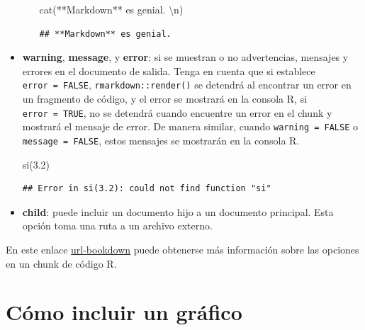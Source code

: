 \documentclass[12pt,a4paper,oneside,]{book}
\newenvironment{Shaded}{\begin{snugshade}}{\end{snugshade}}
\newcommand{\FloatTok}[1]{\textcolor[rgb]{0.00,0.00,0.81}{#1}}
\newcommand{\FunctionTok}[1]{\textcolor[rgb]{0.00,0.00,0.00}{#1}}
\newcommand{\NormalTok}[1]{#1}
\newcommand{\SpecialCharTok}[1]{\textcolor[rgb]{0.00,0.00,0.00}{#1}}
\newcommand{\StringTok}[1]{\textcolor[rgb]{0.31,0.60,0.02}{#1}}
\numberwithin{dummy}{section}
\theoremstyle{ocrenumbox}
\theoremstyle{blacknumex}
\theoremstyle{blacknumbox}
\theoremstyle{ocrenum}
\theoremstyle{ocrenum}
\newenvironment{markdownsal}{\begin{mBox}}{\end{mBox}}
\newcommand{\bmarkdownsal}{\begin{markdownsal}}
\newcommand{\emarkdownsal}{\end{markdownsal}}
\begin{document}
\begin{itemize}
\begin{itemize}
    \bmarkdownsal

\begin{Shaded}
\begin{Highlighting}[]
\FunctionTok{cat}\NormalTok{(}\StringTok{\textquotesingle{}**Markdown** es genial. }\SpecialCharTok{\textbackslash{}n}\StringTok{\textquotesingle{}}\NormalTok{)}
\end{Highlighting}
\end{Shaded}

\begin{verbatim}
## **Markdown** es genial.
\end{verbatim}

    \emarkdownsal
  \end{itemize}
\item
  \textbf{warning}, \textbf{message}, y \textbf{error}: si se muestran o
  no advertencias, mensajes y errores en el documento de salida. Tenga
  en cuenta que si establece \texttt{error\ =\ FALSE},
  \texttt{rmarkdown::render()} se detendrá al encontrar un error en un
  fragmento de código, y el error se mostrará en la consola R, si
  \texttt{error\ =\ TRUE}, no se detendrá cuando encuentre un error en
  el chunk y mostrará el mensaje de error. De manera similar, cuando
  \texttt{warning\ =\ FALSE} o \texttt{message\ =\ FALSE}, estos
  mensajes se mostrarán en la consola R.

  \bmarkdownsal

\begin{Shaded}
\begin{Highlighting}[]
\FunctionTok{si}\NormalTok{(}\FloatTok{3.2}\NormalTok{)}
\end{Highlighting}
\end{Shaded}

\begin{verbatim}
## Error in si(3.2): could not find function "si"
\end{verbatim}

  \emarkdownsal
\item
  \textbf{child}: puede incluir un documento hijo a un documento
  principal. Esta opción toma una ruta a un archivo externo.
\end{itemize}

En este enlace
\href{https://bookdown.org/yihui/rmarkdown/r-code.html}{url-bookdown}
puede obtenerse más información sobre las opciones en un chunk de código
R.

\hypertarget{sec:incluirgrafico}{%
\section{Cómo incluir un gráfico}\label{sec:incluirgrafico}}
\end{document}
